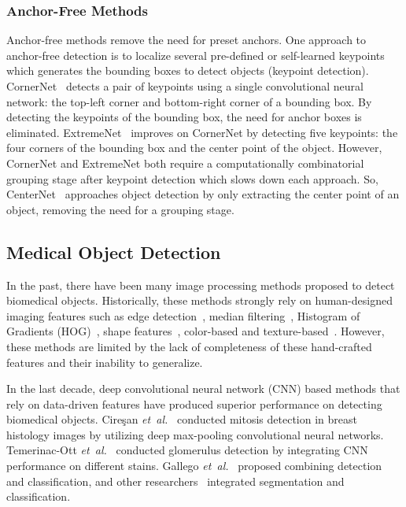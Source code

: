 \documentclass[journal]{IEEEtran}
\begin{document}
\subsubsection{Anchor-Free Methods}
Anchor-free methods remove the need for preset anchors. One approach to anchor-free detection is to localize several pre-defined or self-learned keypoints which generates the bounding boxes to detect objects (keypoint detection). CornerNet~\cite{law2018cornernet} detects a pair of keypoints using a single convolutional neural network: the top-left corner and bottom-right corner of a bounding box. By detecting the keypoints of the bounding box, the need for anchor boxes is eliminated. ExtremeNet~\cite{zhou2019bottom} improves on CornerNet by detecting five keypoints: the four corners of the bounding box and the center point of the object. However, CornerNet and ExtremeNet both require a computationally combinatorial grouping stage after keypoint detection which slows down each approach. So, CenterNet~\cite{zhou2019objects} approaches object detection by only extracting the center point of an object, removing the need for a grouping stage. 

\subsection{Medical Object Detection}
In the past, there have been many image processing methods proposed to detect biomedical objects. Historically, these methods strongly rely on human-designed imaging features such as edge detection~\cite{ma2009glomerulus,jung2010segmenting,esmaeilsabzali2012machine,filipczuk2013computer}, median filtering~\cite{kotyk2016measurement}, Histogram of Gradients (HOG)~\cite{kakimoto2014automated,kakimoto2015quantitative,kato2015segmental}, shape features~\cite{maree2016approach}, color-based and texture-based~\cite{ginley2017unsupervised}. However, these methods are limited by the lack of completeness of these hand-crafted features and their inability to generalize. 

In the last decade, deep convolutional neural network (CNN) based methods that rely on data-driven features have produced superior performance on detecting biomedical objects. Cireşan \textit{et~al.}~\cite{cirecsan2013mitosis} conducted mitosis detection in breast histology images by utilizing deep max-pooling convolutional neural networks. Temerinac-Ott \textit{et~al.}~\cite{temerinac2017detection} conducted glomerulus detection by integrating CNN performance on different stains. Gallego \textit{et~al.}~\cite{gallego2018glomerulus} proposed combining detection and classification, and other researchers~\cite{kannan2019segmentation,gadermayr2017cnn,ginley2019computational,bueno2020glomerulosclerosis,govind2018glomerular} integrated segmentation and classification. 
\end{document}
